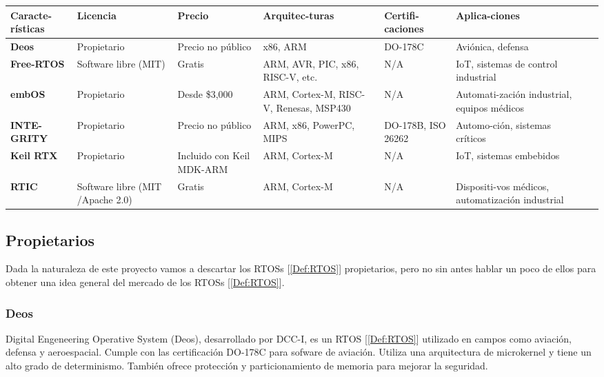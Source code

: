 \begin{table}[h]
\centering
\renewcommand{\arraystretch}{1.5}
\begin{tabularx}{\textwidth}{|X|X|X|X|X|X|X|}
\hline
\textbf{Caracte-rísticas}	&  \textbf{Licencia}						& \textbf{Precio}		 & \textbf{Arquitec-turas}			& \textbf{Certifi-caciones}	& \textbf{Aplica-ciones} \\ \hline
\textbf{Deos}			&  \cellcolor{red!33}Propietario				& Precio no público		 & x86, ARM					& DO-178C			& Aviónica, defensa \\ \hline
\textbf{Free-RTOS}		&  \cellcolor{green!33}Software libre (MIT)			& Gratis			 & ARM, AVR, PIC, x86, RISC-V, etc.		& N/A				& IoT, sistemas de control industrial \\ \hline
\textbf{embOS}			&  \cellcolor{red!33}Propietario				& Desde \$3,000			 & ARM, Cortex-M, RISC-V, Renesas, MSP430	& N/A				& Automati-zación industrial, equipos médicos \\ \hline
\textbf{INTE-GRITY}		&  \cellcolor{red!33}Propietario				& Precio no público		 & ARM, x86, PowerPC, MIPS			& DO-178B, ISO 26262		& Automo-ción, sistemas críticos \\ \hline
\textbf{Keil RTX}		&  \cellcolor{red!33}Propietario				& Incluido con Keil MDK-ARM	 & ARM, Cortex-M				& N/A				& IoT, sistemas embebidos \\ \hline
\textbf{RTIC}			&  \cellcolor{green!33}Software libre (MIT /Apache 2.0)		& Gratis			 & ARM, Cortex-M				& N/A				& Dispositi-vos médicos, automatización industrial \\ \hline
\end{tabularx}
\label{tab:Comparativa de sistemas operativos de tiempo real}
\end{table}

\subsection{Propietarios}
Dada la naturaleza de este proyecto vamos a descartar los RTOSs [\ref{Def:RTOS}] propietarios, pero no sin antes hablar un poco de ellos para obtener una idea general del mercado de los RTOSs [\ref{Def:RTOS}].

\subsubsection{Deos}
Digital Engeneering Operative System (Deos), desarrollado por DCC-I, es un RTOS [\ref{Def:RTOS}] utilizado en campos como aviación, defensa y aeroespacial. Cumple con las certificación DO-178C para sofware de aviación. Utiliza una arquitectura de microkernel y tiene un alto grado de determinismo. También ofrece protección y particionamiento de memoria para mejorar la seguridad.

